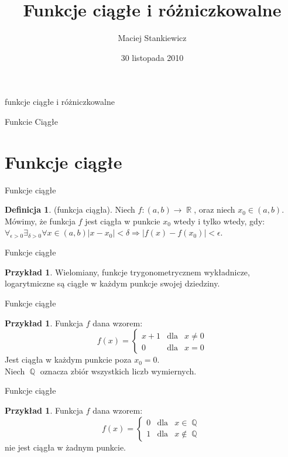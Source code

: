 \documentclass{beamer}
\title{Funkcje ciągłe i różniczkowalne}
\author{Maciej Stankiewicz}
\date{30 listopada 2010}
\theoremstyle{definition}
\newtheorem{df}[tw]{Definicja}
\newtheorem{ex}[tw]{Przykład}
\DeclareMathOperator{\R}{\mathbb{R}}
\DeclareMathOperator{\Q}{\mathbb{Q}}
\begin{document}
\begin{frame}{funkcje ciągłe i różniczkowalne}
\titlepage
\end{frame}

\begin{frame}{Funkcie Ciągłe}

\end{frame}



\section{Funkcje ciągłe}
\begin{frame}{Funkcje ciągłe}
	\begin{df}
		(funkcja ciągła). Niech $f : (a,b) \rightarrow \R$, oraz niech $x_0 \in (a,b)$. %
		Mówimy, że funkcja $f$ jest ciągła w punkcie $x_0$ wtedy i tylko wtedy, gdy:\\

	$\forall_{\epsilon > 0} \exists_{ \delta > 0} \forall x \in (a,b) |x - x_0| < \delta \Rightarrow |f(x) - f(x_0)| < \epsilon$.
	\end{df}
\end{frame}
\begin{frame}{Funkcje ciągłe}
	\begin{ex}
		Wielomiany, funkcje trygonometrycznem wykładnicze, logarytmiczne są ciągłe w każdym punkcje swojej dziedziny.
	\end{ex}
\end{frame}
\begin{frame}{Funkcje ciągłe}
	\begin{ex}
		Funkcja $f$ dana wzorem:\\
	\begin{displaymath} 
		f(x)= \left\{\begin{array}{lll}
		x+1 & \textrm{dla} & x \neq 0 \\
		0 & \textrm{dla} & x=0
		\end{array} \right.
 	\end{displaymath}
		Jest ciągła w każdym punkcie poza $x_0 = 0$.\\
		Niech $\Q$ oznacza zbiór wszystkich liczb wymiernych.\\

	\end{ex}
\end{frame}
\begin{frame}{Funkcje ciągłe}
	\begin{ex}
		Funkcja $f$ dana wzorem:\\
		\begin{displaymath} 
			f(x)= \left\{\begin{array}{lll}
			0 & \textrm{dla} & x \in \Q \\
			1 & \textrm{dla} & x \notin \Q
			\end{array} \right.
 		\end{displaymath}
		nie jest ciągła w żadnym punkcie.\\
	\end{ex}
\end{frame}
\end{document}
